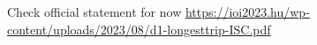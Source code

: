 Check official statement for now \url{https://ioi2023.hu/wp-content/uploads/2023/08/d1-longesttrip-ISC.pdf}